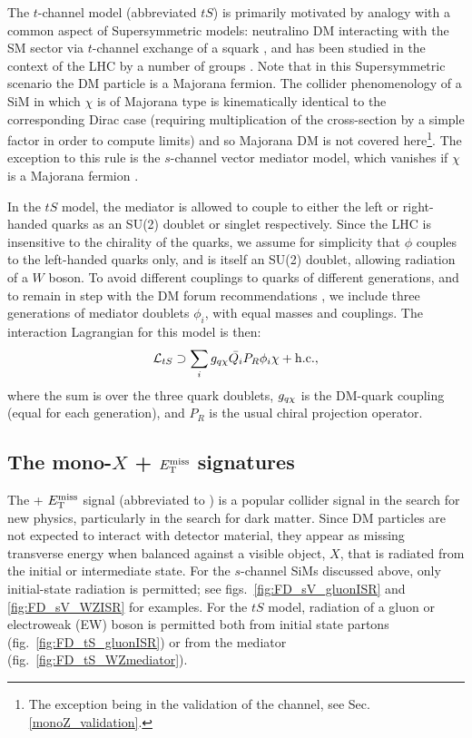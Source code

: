 The $t$-channel model (abbreviated $tS$) is primarily
motivated by analogy with a common aspect of Supersymmetric models: neutralino DM interacting with the SM sector via $t$-channel exchange of a squark \cite{SUSYDM}, and has been studied in the context of the LHC by a number of groups \cite{DiFranzo:2013vra, Bai:2013iqa, An:2013xka, Chang:2013oia, Zurek:tchannel, Garny:2015wea,  Garny:2014waa, Bell:2011if, Bell:2015rdw}. Note that in this Supersymmetric scenario the DM particle is a Majorana fermion. The collider phenomenology of a SiM in which $\chi$ is of Majorana type is kinematically identical to the corresponding Dirac case (requiring multiplication of the cross-section by a simple factor in order to compute limits) and so Majorana DM is not covered here\footnote{The exception being in the validation of the \monoZ channel, see Sec. \ref{monoZ_validation}.}. The exception to this rule is the $s$-channel vector mediator model, which vanishes if $\chi$ is a Majorana fermion \cite{METSig}.

In the $tS$ model, the mediator is allowed to couple to either the left or right-handed quarks as an SU(2) doublet or singlet respectively. Since the LHC is insensitive to the chirality of the quarks, we assume for simplicity that $\phi$ couples to the left-handed quarks only, and is itself an SU(2) doublet, allowing radiation of a $W$ boson. To avoid different couplings to quarks of different generations, and to remain in step with the DM forum recommendations \cite{DMForumReport}, we include three generations of mediator doublets $\phi_i$, with equal masses and couplings. The interaction Lagrangian for this model is then:
\begin{equation}
\label{L_int_tS}
\mathcal{L}_{tS} \supset \sum_{i} g_{q \chi} \bar{Q_i} P_R \phi_i \chi + {\rm h.c.},
\end{equation}
where the sum is over the three quark doublets, $g_{q \chi}$ is the DM-quark coupling (equal for each generation), and $P_R$ is the usual chiral projection operator.

\subsection{The mono-$X$ + $E_{\mathrm{T}}^{\mathrm{miss}}$ signatures}
The \monoX + $E_{\mathrm{T}}^{\mathrm{miss}}$ signal (abbreviated to \monoX) is a popular collider signal in the search for new physics, particularly in the search for dark matter. Since DM particles are not expected to interact with detector material, they appear as missing transverse energy when balanced against a visible object, $X$, that is radiated from the initial or intermediate state. %
For the $s$-channel SiMs discussed above, only initial-state radiation is permitted; see figs.~\ref{fig:FD_sV_gluonISR} and \ref{fig:FD_sV_WZISR} for examples. For the $tS$ model, radiation of a gluon or electroweak (EW) boson is permitted both from initial state partons (fig.~\ref{fig:FD_tS_gluonISR}) or from the mediator (fig.~\ref{fig:FD_tS_WZmediator}).

